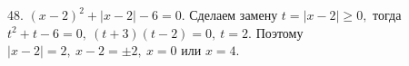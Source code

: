 48. $(x-2)^2+|x-2|-6=0.$ Сделаем замену $t=|x-2|\geqslant0,$ тогда $t^2+t-6=0,\ (t+3)(t-2)=0,\ t=2.$ Поэтому $|x-2|=2,\ x-2=\pm2,\ x=0$ или $x=4.$\\
